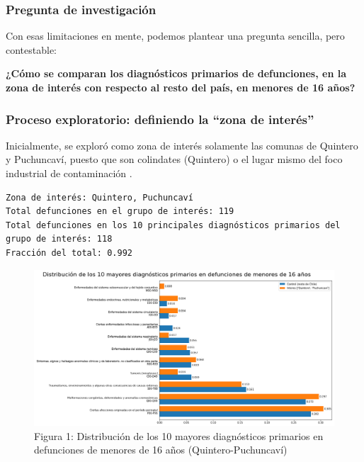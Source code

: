 \documentclass[]{article}
\begin{document}
\hypertarget{pregunta-de-investigaciuxf3n}{%
\subsubsection{Pregunta de
investigación}\label{pregunta-de-investigaciuxf3n}}

Con esas limitaciones en mente, podemos plantear una pregunta sencilla,
pero contestable:

\textbf{¿Cómo se comparan los diagnósticos primarios de defunciones, en
la zona de interés con respecto al resto del país, en menores de 16
años?}

\hypertarget{proceso-exploratorio-definiendo-la-zona-de-interuxe9s}{%
\subsubsection{Proceso exploratorio: definiendo la ``zona de
interés''}\label{proceso-exploratorio-definiendo-la-zona-de-interuxe9s}}

Inicialmente, se exploró como zona de interés solamente las comunas de
Quintero y Puchuncaví, puesto que son colindates (Quintero) o el lugar mismo del
foco industrial de contaminación .

\begin{verbatim}
Zona de interés: Quintero, Puchuncaví
Total defunciones en el grupo de interés: 119
Total defunciones en los 10 principales diagnósticos primarios del grupo de interés: 118
Fracción del total: 0.992
\end{verbatim}

\begin{figure}
\centering
\includegraphics{assets/10-diagnosticos-(Quintero-Puchuncavi).png}
\caption{Figura 1: Distribución de los 10 mayores diagnósticos primarios en defunciones de menores de 16 años (Quintero-Puchuncaví)}
\end{figure}
\end{document}
